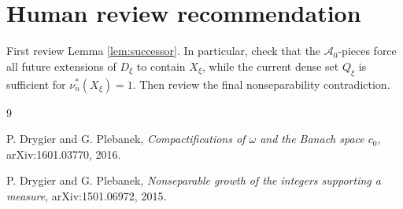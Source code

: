 \documentclass[11pt]{amsart}
\theoremstyle{definition}
\newcommand{\A}{\mathcal A}
\begin{document}
\section*{Human review recommendation}

First review Lemma \ref{lem:successor}.  In particular, check that the
\(\A_0\)-pieces force all future extensions of \(D_\xi\) to contain \(X_\xi\),
while the current dense set \(Q_\xi\) is sufficient for \(\nu_n^*(X_\xi)=1\).
Then review the final nonseparability contradiction.

\begin{thebibliography}{9}

P. Drygier and G. Plebanek,
\emph{Compactifications of \(\omega\) and the Banach space \(c_0\)},
arXiv:1601.03770, 2016.

P. Drygier and G. Plebanek,
\emph{Nonseparable growth of the integers supporting a measure},
arXiv:1501.06972, 2015.

\end{thebibliography}
\end{document}
